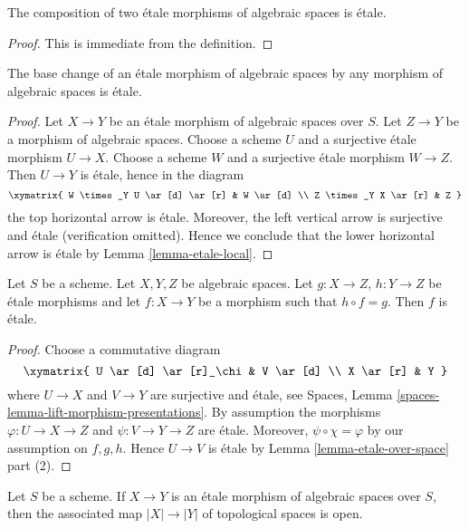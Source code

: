 \begin{lemma}
\label{lemma-composition-etale}
The composition of two \'etale morphisms of algebraic spaces
is \'etale.
\end{lemma}

\begin{proof}
This is immediate from the definition.
\end{proof}

\begin{lemma}
\label{lemma-base-change-etale}
The base change of an \'etale morphism of algebraic spaces
by any morphism of algebraic spaces is \'etale.
\end{lemma}

\begin{proof}
Let $X \to Y$ be an \'etale morphism of algebraic spaces over $S$.
Let $Z \to Y$ be a morphism of algebraic spaces.
Choose a scheme $U$ and a surjective \'etale morphism $U \to X$.
Choose a scheme $W$ and a surjective \'etale morphism $W \to Z$.
Then $U \to Y$ is \'etale, hence in the diagram
$$
\xymatrix{
W \times_Y U \ar[d] \ar[r] & W \ar[d] \\
Z \times_Y X \ar[r] & Z
}
$$
the top horizontal arrow is \'etale.
Moreover, the left vertical arrow is surjective
and \'etale (verification omitted). Hence we conclude that the lower
horizontal arrow is \'etale by Lemma \ref{lemma-etale-local}.
\end{proof}

\begin{lemma}
\label{lemma-etale-permanence}
Let $S$ be a scheme. Let $X, Y, Z$ be algebraic spaces.
Let $g : X \to Z$, $h : Y \to Z$ be \'etale morphisms and let
$f : X \to Y$ be a morphism such that $h \circ f = g$.
Then $f$ is \'etale.
\end{lemma}

\begin{proof}
Choose a commutative diagram
$$
\xymatrix{
U \ar[d] \ar[r]_\chi & V \ar[d] \\
X \ar[r] & Y
}
$$
where $U \to X$ and $V \to Y$ are surjective and \'etale, see
Spaces, Lemma \ref{spaces-lemma-lift-morphism-presentations}.
By assumption the morphisms $\varphi : U \to X \to Z$ and
$\psi : V \to Y \to Z$ are \'etale. Moreover, $\psi \circ \chi = \varphi$
by our assumption on $f, g, h$.
Hence $U \to V$ is \'etale by Lemma \ref{lemma-etale-over-space}
part (2).
\end{proof}

\begin{lemma}
\label{lemma-etale-open}
Let $S$ be a scheme.
If $X \to Y$ is an \'etale morphism of algebraic spaces over $S$,
then the associated map $|X| \to |Y|$ of topological spaces
is open.
\end{lemma}

